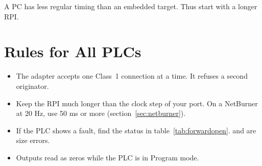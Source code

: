 A PC has less regular timing than an embedded target. Thus start with a
longer RPI.

\section{Rules for All PLCs}

\begin{itemize}
  \item The adapter accepts one Class~1 connection at a time. It refuses a
        second originator.
  \item Keep the RPI much longer than the clock step of your port. On a
        NetBurner at 20 Hz, use 50 ms or more (section~\ref{sec:netburner}).
  \item If the PLC shows a fault, find the status in
        table~\ref{tab:forwardopen}.  and  are
        size errors.
  \item Outputs read as zeros while the PLC is in Program mode.
\end{itemize}
